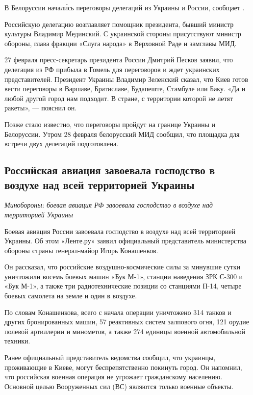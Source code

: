 В Белоруссии начал\'{и}сь переговоры делегаций из Украины и России, сообщает .

Российскую делегацию возглавляет помощник президента, бывший министр культуры Владимир Мединский. С украинской стороны присутствуют министр обороны, глава фракции «Слуга народа» в Верховной Раде и замглавы МИД.

27 февраля пресс-секретарь президента России Дмитрий Песков заявил, что делегация из РФ прибыла в Гомель для переговоров и ждет украинских представителей. Президент Украины Владимир Зеленский сказал, что Киев готов вести переговоры в Варшаве, Братиславе, Будапеште, Стамбуле или Баку. «Да и любой другой город нам подходит. В стране, с территории которой не летят ракеты», --- пояснил он.

Позже стало известно, что переговоры пройдут на границе Украины и Белоруссии. Утром 28 февраля белорусский МИД сообщил, что площадка для встречи двух делегаций подготовлена.

\subsection{Российская авиация завоевала господство в воздухе над всей территорией Украины}
\textit{Минобороны: боевая авиация РФ завоевала господство в воздухе над территорией Украины}

Боевая авиация России завоевала господство в воздухе над всей территорией Украины. Об этом «Ленте.ру» заявил официальный представитель министерства обороны страны генерал-майор Игорь Конашенков.

Он рассказал, что российские воздушно-космические силы за минувшие сутки уничтожили восемь боевых машин «Бук М-1», станции наведения ЗРК С-300 и «Бук М-1», а также три радиотехнические позиции со станциями П-14, четыре боевых самолета на земле и один в воздухе.

По словам Конашенкова, всего с начала операции уничтожено 314 танков и других бронированных машин, 57 реактивных систем залпового огня, 121 орудие полевой артиллерии и минометов, а также 274 единицы военной автомобильной техники.

Ранее официальный представитель ведомства сообщил, что украинцы, проживающие в Киеве, могут беспрепятственно покинуть город. Он напомнил, что российская военная операция не угрожает гражданскому населению. Основной целью Вооруженных сил (ВС) являются только военные объекты.

